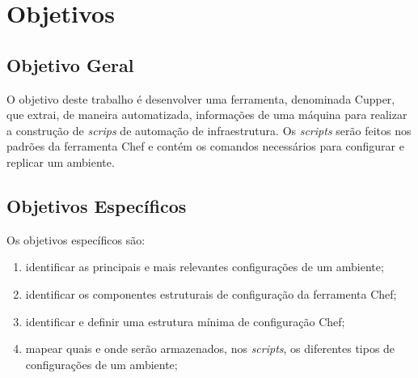 \section*{Objetivos}
\label{sec:obj}

\subsection*{Objetivo Geral}
\label{sec:obj-grl}

O objetivo deste trabalho é desenvolver uma ferramenta, denominada Cupper,
que extrai, de maneira automatizada, informações de uma máquina para realizar
a construção de \textit{scrips} de automação de infraestrutura. Os \textit{scripts}
serão feitos nos padrões da ferramenta Chef e contém os comandos
necessários para configurar e replicar um ambiente.

\subsection*{Objetivos Específicos}
\label{sec:obj-esp}

Os objetivos específicos são:

\begin{enumerate}
  \item identificar as principais e mais relevantes configurações de um ambiente;
  \item identificar os componentes estruturais de configuração da ferramenta Chef;
  \item identificar e definir uma estrutura mínima de configuração Chef;
  \item mapear quais e onde serão armazenados, nos \textit{scripts}, os
    diferentes tipos de configurações de um ambiente;
\end{enumerate}
